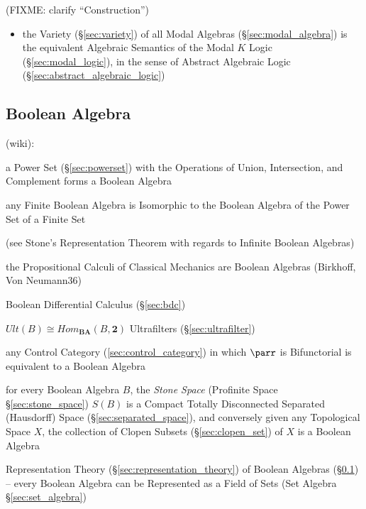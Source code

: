 (FIXME: clarify ``Construction'')

\begin{itemize}
\item the Variety (\S\ref{sec:variety}) of all Modal Algebras
  (\S\ref{sec:modal_algebra}) is the equivalent Algebraic Semantics of the Modal
  $K$ Logic (\S\ref{sec:modal_logic}), in the sense of Abstract Algebraic Logic
  (\S\ref{sec:abstract_algebraic_logic})
\end{itemize}



\subsection{Boolean Algebra}\label{sec:boolean_algebra}

(wiki):

a Power Set (\S\ref{sec:powerset}) with the Operations of Union, Intersection,
and Complement forms a Boolean Algebra

any Finite Boolean Algebra is Isomorphic to the Boolean Algebra of the Power Set
of a Finite Set

(see Stone's Representation Theorem with regards to Infinite Boolean Algebras)

the Propositional Calculi of Classical Mechanics are Boolean Algebras (Birkhoff,
Von Neumann36)

\fist Boolean Differential Calculus (\S\ref{sec:bdc})

$Ult(B) \cong Hom_\mathbf{BA}(B,\mathbf{2})$ Ultrafilters
(\S\ref{sec:ultrafilter})

any Control Category (\ref{sec:control_category}) in which $\parr$ is
Bifunctorial is equivalent to a Boolean Algebra \cite{selinger01}

for every Boolean Algebra $B$, the \emph{Stone Space} (Profinite Space
\S\ref{sec:stone_space}) $\xspace{S}(B)$ is a Compact Totally Disconnected
Separated (Hausdorff) Space (\S\ref{sec:separated_space}), and conversely given
any Topological Space $X$, the collection of Clopen Subsets
(\S\ref{sec:clopen_set}) of $X$ is a Boolean Algebra

Representation Theory (\S\ref{sec:representation_theory}) of Boolean Algebras
(\S\ref{sec:boolean_algebra}) -- every Boolean Algebra can be Represented as a
Field of Sets (Set Algebra \S\ref{sec:set_algebra})

